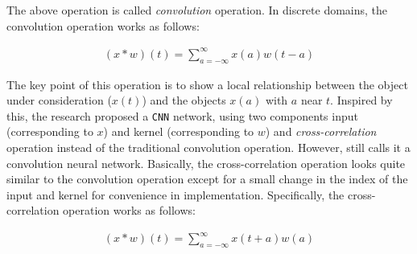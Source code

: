 The above operation is called \textit{convolution} operation. In discrete domains, the convolution operation works as follows:

\begin{align}
    (x*w)(t) = \sum_{a=-\infty}^\infty{x(a) w(t-a)}
\end{align}


The key point of this operation is to show a local relationship between the object under consideration ($x(t)$) and the objects $x(a)$ with $a$ near $t$. Inspired by this, the research \cite{lecun1989handwritten} proposed a \verb|CNN| network, using two components input (corresponding to $x$) and kernel (corresponding to $w$) and \textit{cross-correlation} operation instead of the traditional convolution operation. However, \cite{lecun1989handwritten} still calls it a convolution neural network. Basically, the cross-correlation operation looks quite similar to the convolution operation except for a small change in the index of the input and kernel for convenience in implementation. Specifically, the cross-correlation operation works as follows:

\begin{align}
    (x*w)(t) = \sum_{a=-\infty}^\infty{x(t+a) w(a)}
\end{align}


